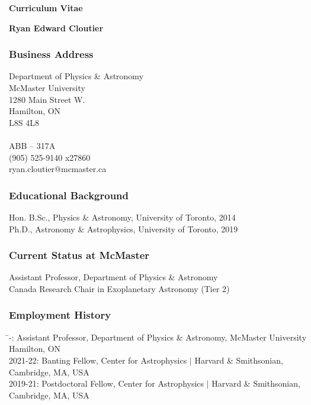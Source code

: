 \documentclass[12pt]{article}
\begin{document}
\thispagestyle{empty}
\centerline{{\large\bf Curriculum Vitae}}
\vspace{2ex}

\centerline{\bf Ryan Edward Cloutier}
\subsubsection*{Business Address}

Department of Physics \& Astronomy \\
McMaster University \\
1280 Main Street W. \\
Hamilton, ON \\
L8S 4L8 \\
\\
ABB -- 317A \\
(905) 525-9140 x27860 \\ 
ryan.cloutier@mcmaster.ca

\subsubsection*{Educational Background}
Hon. B.Sc., Physics \& Astronomy, University of Toronto, 2014\\
Ph.D., Astronomy \& Astrophysics, University of Toronto, 2019 

\subsubsection*{Current Status at McMaster}
Assistant Professor, Department of Physics \& Astronomy \\
Canada Research Chair in Exoplanetary Astronomy (Tier 2) 


\subsubsection*{Employment History}

\begin{tabbing}
\hspace{2.5cm} 	\= -: \> Assistant Professor, Department of Physics \& Astronomy, McMaster University \\
\> Hamilton, ON \\
2021-22: \> Banting Fellow, Center for Astrophysics $|$ Harvard \& Smithsonian, \\
\> Cambridge, MA, USA \\
2019-21: \> Postdoctoral Fellow, Center for Astrophysics $|$ Harvard \& Smithsonian, \\
\> Cambridge, MA, USA \\
\end{tabbing}
\end{document}

